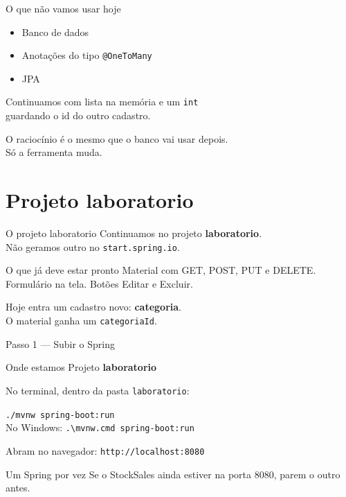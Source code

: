 \documentclass[aspectratio=169,11pt]{beamer}
\newcommand{\onde}[1]{%
  \begin{block}{Onde estamos}
    #1
  \end{block}
}
\begin{document}
\begin{frame}{O que não vamos usar hoje}
  \begin{itemize}
    \item Banco de dados
    \item Anotações do tipo \texttt{@OneToMany}
    \item JPA
  \end{itemize}

  \vspace{0.5em}
  Continuamos com lista na memória e um \texttt{int}\\
  guardando o id do outro cadastro.

  \vspace{0.5em}
  O raciocínio é o mesmo que o banco vai usar depois.\\
  Só a ferramenta muda.
\end{frame}

\section{Projeto laboratorio}

\begin{frame}{O projeto laboratorio}
  Continuamos no projeto \textbf{laboratorio}.\\
  Não geramos outro no \texttt{start.spring.io}.

  \vspace{0.5em}
  \begin{block}{O que já deve estar pronto}
    Material com GET, POST, PUT e DELETE.\\
    Formulário na tela. Botões Editar e Excluir.
  \end{block}

  \vspace{0.5em}
  Hoje entra um cadastro novo: \textbf{categoria}.\\
  O material ganha um \texttt{categoriaId}.
\end{frame}

\begin{frame}{Passo 1 --- Subir o Spring}
  \onde{Projeto \textbf{laboratorio}}

  No terminal, dentro da pasta \texttt{laboratorio}:

  \vspace{0.4em}
  \texttt{./mvnw spring-boot:run}\\
  {\small No Windows: \texttt{.\textbackslash mvnw.cmd spring-boot:run}}

  \vspace{0.5em}
  Abram no navegador: \texttt{http://localhost:8080}

  \vspace{0.5em}
  \begin{alertblock}{Um Spring por vez}
    Se o StockSales ainda estiver na porta 8080,
    parem o outro antes.
  \end{alertblock}
\end{frame}
\end{document}
